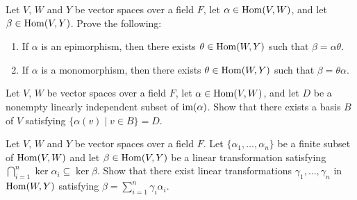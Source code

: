 \probskip


\begin{problem}[Golan 293 \& 294]
Let $V$, $W$ and $Y$ be vector spaces over a field $F$, let 
$\alpha \in \operatorname{Hom}(V, W)$, and 
let $\beta \in \operatorname{Hom}(V,Y)$. Prove the following:
\begin{enumerate}
\item  If $\alpha$ is an epimorphism, then 
there exists $\theta \in \operatorname{Hom}(W,Y)$ such that $\beta = \alpha \theta$.
\item  If $\alpha$ is a monomorphism, then 
there exists $\theta \in \operatorname{Hom}(W,Y)$ such that $\beta = \theta \alpha$.
\end{enumerate}
\end{problem}


\probskip

\begin{problem}[Golan 296]\hskip-2mm\protect\footnotemark
\label{prob:296}
Let $V$, $W$ be vector spaces over a field $F$, let 
$\alpha \in \operatorname{Hom}(V, W)$, and let $D$ be a nonempty linearly independent subset
of $\operatorname{im}(\alpha)$.  Show that there exists a basis $B$ of $V$ satisfying
$\{\alpha(v)\mid v \in B\} = D$.
\end{problem}

\probskip

\begin{problem}[Golan 306]
Let $V$, $W$ and $Y$ be vector spaces over a field $F$.  Let 
$\{\alpha_1, \dots, \alpha_n\}$ be a finite subset of $\operatorname{Hom}(V, W)$
and let $\beta \in \operatorname{Hom}(V,Y)$ be a linear transformation satisfying
$\bigcap_{i=1}^n \ker{\alpha_i} \subseteq \ker{\beta}$.  Show that there exist
linear transformations $\gamma_1, \dots, \gamma_n$ in $\operatorname{Hom}(W,Y)$ satisfying
$\beta = \sum_{i=1}^n \gamma_i \alpha_i$.
\end{problem}

\probskip



%
%


